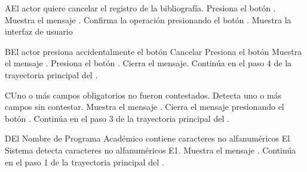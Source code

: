 \begin{UCtrayectoriaA}{A}{El actor quiere cancelar el registro de la bibliografía.}
	\UCpaso[\UCactor] Presiona el botón .
    \UCpaso Muestra el mensaje .
    \UCpaso[\UCactor] Confirma la operación presionando el botón .
    \UCpaso Muestra la interfaz de usuario 
\end{UCtrayectoriaA}
\begin{UCtrayectoriaA}{B}{El actor presiona accidentalmente el botón Cancelar}
	\UCpaso[\UCactor] Presiona el botón 
    \UCpaso Muestra el mensaje .
    \UCpaso[\UCactor] Presiona el botón .
    \UCpaso Cierra el mensaje.
    \UCpaso Continúa en el paso 4 de la trayectoria principal del .
\end{UCtrayectoriaA}
\begin{UCtrayectoriaA}{C}{Uno o más campos obligatorios no fueron contestados.}
	\UCpaso Detecta uno o más campos sin contestar.
    \UCpaso Muestra el mensaje .
    \UCpaso[\UCactor] Cierra el mensaje presionando el botón .
    \UCpaso Continúa en el paso 3 de la trayectoria principal del .
\end{UCtrayectoriaA}
\begin{UCtrayectoriaA}{D}{El Nombre de Programa Académico contiene caracteres no alfanuméricos}
	\UCpaso El Sistema detecta caracteres no alfanuméricos E1.
    \UCpaso Muestra el mensaje .
    \UCpaso Continúa en el paso 1 de la trayectoria principal del .
\end{UCtrayectoriaA}